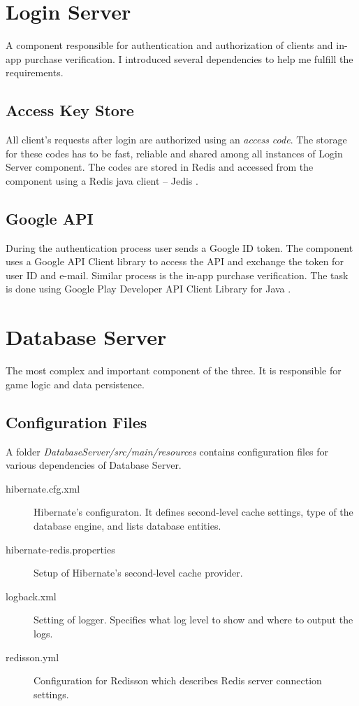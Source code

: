 \section{Login Server}
A component responsible for authentication and authorization of clients and in-app purchase verification. I introduced several dependencies to help me fulfill the requirements.
 
\subsection{Access Key Store}
All client's requests after login are authorized using an \textit{access code}. The storage for these codes has to be fast, reliable and shared among all instances of Login Server component. The codes are stored in Redis and accessed from the component using a Redis java client -- Jedis \cite{jedis}. 

\subsection{Google API}
During the authentication process user sends a Google ID token. The component uses a Google API Client library \cite{googleapilibs} to access the API and exchange the token for user ID and e-mail. Similar process is the in-app purchase verification. The task is done using Google Play Developer API Client Library for Java  \cite{androidpublisherlibary}.

\section{Database Server}
The most complex and important component of the three. It is responsible for game logic and data persistence.

\subsection{Configuration Files}
A folder \textit{DatabaseServer/src/main/resources} contains configuration files for various dependencies of Database Server.
\begin{description}
	\item[hibernate.cfg.xml] Hibernate's configuraton. It defines second-level cache settings, type of the database engine, and lists database entities.
	\item[hibernate-redis.properties] Setup of Hibernate's second-level cache provider.
	\item[logback.xml] Setting of logger. Specifies what log level to show and where to output the logs.
	\item[redisson.yml] Configuration for Redisson which describes Redis server connection settings. 
\end{description}

